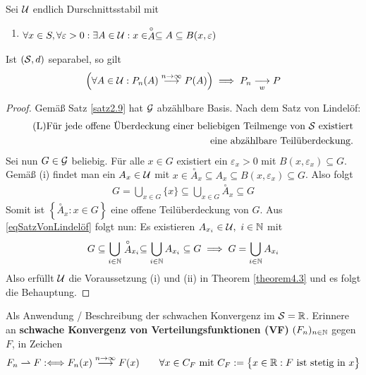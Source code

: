 \begin{korollar}\label{korollar4.4}
	Sei $\U$ endlich Durschnittsstabil mit
	\begin{enumerate}[label=(\roman*)]
		\item $\begin{aligned}
			\forall x\in S,\forall\varepsilon>0:\exists A\in\U:x\in\stackrel{\circ}{A}\subseteq A\subseteq B(x,\varepsilon)
		\end{aligned}$
	\end{enumerate}
	Ist $(\S,d)$ separabel, so gilt
	\begin{align*}
		\Big(\forall A\in\U:P_n(A)\stackrel{n\to\infty}{\longrightarrow} P(A)\Big)
		\implies P_n\stackrelnew{w}{}{\longrightarrow} P
	\end{align*}
\end{korollar}

\begin{proof}
	Gemäß Satz \ref{satz2.9} hat $\G$ abzählbare Basis. 
	Nach dem Satz von Lindelöf:
	\begin{align}\label{eqSatzVonLindelöf}\tag{L}
		\text{Für jede offene Überdeckung einer beliebigen Teilmenge von $\S$ existiert}\\\nonumber\text{eine abzählbare Teilüberdeckung.}
	\end{align}
	Sei nun $G\in\G$ beliebig. 
	Für alle $x\in G$ existiert ein $\varepsilon_x>0$ mit $B(x,\varepsilon_x)\subseteq G$.
	Gemäß (i) findet man ein $A_x\in\U$ mit $x\in\stackrel{\circ}{A}_x\subseteq A_x\subseteq B(x,\varepsilon_x)\subseteq G$. 
	Also folgt
	\begin{align*}
		G=\bigcup\limits_{x\in G}\lbrace x\rbrace\subseteq\bigcup\limits_{x\in G}\stackrel{\circ}{A}_x\subseteq G
	\end{align*}
	Somit ist $\left\lbrace\stackrel{\circ}{A}_x:x\in G\right\rbrace$ eine offene Teilüberdeckung von $G$. 
	Aus \eqref{eqSatzVonLindelöf} folgt nun: 
	Es existieren $A_{x_i}\in\U,~i\in\N$ mit
	\begin{align*}
		G\subseteq\bigcup\limits_{i\in\N}\stackrel{\circ}{A}_{x_i}\subseteq 
		\bigcup\limits_{i\in\N}A_{x_i}\subseteq 
		G
		\implies
		G=\bigcup\limits_{i\in\N}A_{x_i}
	\end{align*}
	Also erfüllt $\U$ die Voraussetzung (i) und (ii) in Theorem \ref{theorem4.3} und es folgt die Behauptung.
\end{proof}

Als Anwendung / Beschreibung der schwachen Konvergenz im $\S=\R$. 
Erinnere an \textbf{schwache Konvergenz von Verteilungsfunktionen (VF)} $(F_n)_{n\in\N}$ gegen $F$, in Zeichen
\begin{align*}
	F_n\rightharpoonup F
	:\Longleftrightarrow
	F_n(x)\stackrel{n\to\infty}{\longrightarrow} F(x)\qquad\forall x\in C_F
	\mit C_F:=\big\lbrace x\in\R:F\text{ ist stetig in }x\big\rbrace
\end{align*}

